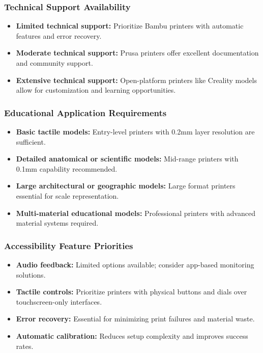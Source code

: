 \subsubsection{Technical Support Availability}
\begin{itemize}
	\item \textbf{Limited technical support:} Prioritize Bambu printers with automatic features and error recovery.
	\item \textbf{Moderate technical support:} Prusa printers offer excellent documentation and community support.
	\item \textbf{Extensive technical support:} Open-platform printers like Creality models allow for customization and learning opportunities.
\end{itemize}

\subsubsection{Educational Application Requirements}
\begin{itemize}
	\item \textbf{Basic tactile models:} Entry-level printers with 0.2mm layer resolution are sufficient.
	\item \textbf{Detailed anatomical or scientific models:} Mid-range printers with 0.1mm capability recommended.
	\item \textbf{Large architectural or geographic models:} Large format printers essential for scale representation.
	\item \textbf{Multi-material educational models:} Professional printers with advanced material systems required.
\end{itemize}

\subsubsection{Accessibility Feature Priorities}
\begin{itemize}
	\item \textbf{Audio feedback:} Limited options available; consider app-based monitoring solutions.
	\item \textbf{Tactile controls:} Prioritize printers with physical buttons and dials over touchscreen-only interfaces.
	\item \textbf{Error recovery:} Essential for minimizing print failures and material waste.
	\item \textbf{Automatic calibration:} Reduces setup complexity and improves success rates.
\end{itemize}

